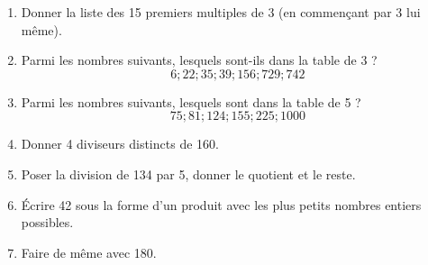 \documentclass[a4paper]{book}
\begin{document}
\medskip


    \begin{exercice}
        \begin{enumerate}[leftmargin=*]
            \item Donner la liste des 15 premiers multiples de 3 (en commençant par 3 lui même).

            \item Parmi les nombres suivants, lesquels sont-ils dans la table de 3 ?
            \[6; 22; 35; 39; 156; 729; 742\]

            \item Parmi les nombres suivants, lesquels sont dans la table de 5 ?
            \[75; 81; 124; 155; 225; 1000\]

            \item Donner 4 diviseurs distincts de 160.

            \item Poser la division de 134 par 5, donner le quotient et le reste.

            \item Écrire 42 sous la forme d'un produit avec les plus petits nombres entiers possibles.

            \item Faire de même avec 180.
        \end{enumerate}
    \end{exercice}
\end{document}
